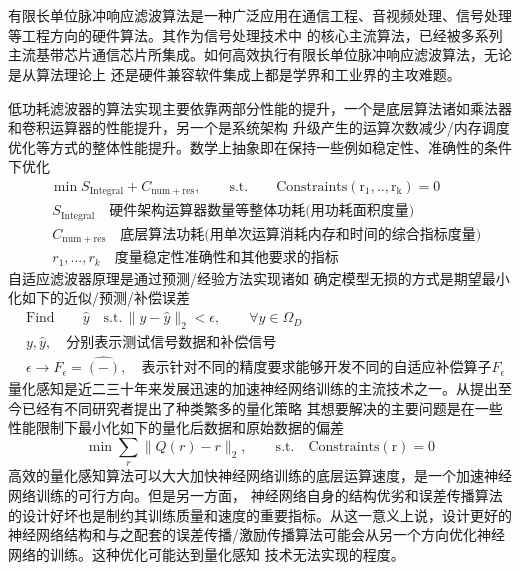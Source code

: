 \section{}


有限长单位脉冲响应滤波算法是一种广泛应用在通信工程、音视频处理、信号处理等工程方向的硬件算法。其作为信号处理技术中
的核心主流算法，已经被多系列主流基带芯片通信芯片所集成。如何高效执行有限长单位脉冲响应滤波算法，无论是从算法理论上
还是硬件兼容软件集成上都是学界和工业界的主攻难题。

低功耗滤波器的算法实现主要依靠两部分性能的提升，一个是底层算法诸如乘法器和卷积运算器的性能提升，另一个是系统架构
升级产生的运算次数减少/内存调度优化等方式的整体性能提升。数学上抽象即在保持一些例如稳定性、准确性的条件下优化
\begin{align*}
    &\min S_{\mathrm{Integral}} + C_{\mathrm{num+res}},\qquad \mathrm{s.t.}\qquad \mathrm{Constraints(r_1,..,r_k) = 0}\\
    & \, S_{\mathrm{Integral}} \quad \text{硬件架构运算器数量等整体功耗(用功耗面积度量)}\\
    & \, C_{\mathrm{num+res}}   \quad \text{底层算法功耗(用单次运算消耗内存和时间的综合指标度量)}\\
    & \, r_1,...,r_k            \quad \text{度量稳定性准确性和其他要求的指标}
\end{align*}
自适应滤波器原理是通过预测/经验方法实现诸如 确定模型无损的方式是期望最小化如下的近似/预测/补偿误差
\begin{align*}
    &\mathrm{Find} \qquad \widehat{y} \quad \mathrm{s.t.} \, \| y - \widehat{y} \|_2 < \epsilon,\qquad\forall y \in \Omega_{D}\\
    & y,\widehat{y},\quad \text{分别表示测试信号数据和补偿信号}\\
    & \epsilon \to F_{\epsilon} = \widehat{(-)},\quad \text{表示针对不同的精度要求能够开发不同的自适应补偿算子} F_{\epsilon}
\end{align*}
量化感知是近二三十年来发展迅速的加速神经网络训练的主流技术之一。从提出至今已经有不同研究者提出了种类繁多的量化策略
其想要解决的主要问题是在一些性能限制下最小化如下的量化后数据和原始数据的偏差
\begin{equation*}
    \min \sum_{r} \| Q(r) - r \|_2,\qquad \mathrm{s.t.}\quad \mathrm{Constraints(r) = 0}
\end{equation*}
高效的量化感知算法可以大大加快神经网络训练的底层运算速度，是一个加速神经网络训练的可行方向。但是另一方面，
神经网络自身的结构优劣和误差传播算法的设计好坏也是制约其训练质量和速度的重要指标。从这一意义上说，设计更好的
神经网络结构和与之配套的误差传播/激励传播算法可能会从另一个方向优化神经网络的训练。这种优化可能达到量化感知
技术无法实现的程度。

